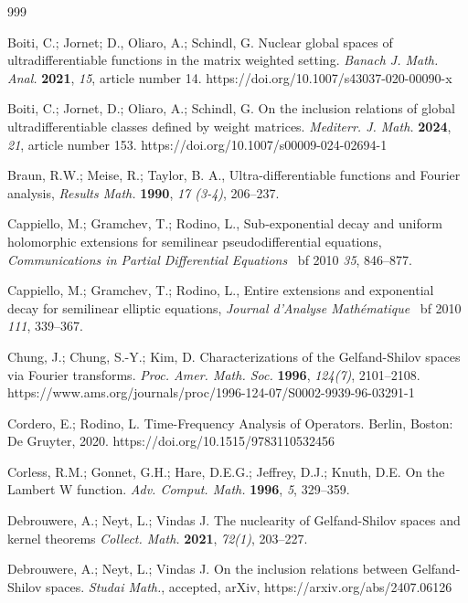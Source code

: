 \documentclass{article}
\theoremstyle{thmstyleone}
\theoremstyle{thmstyletwo}%
\theoremstyle{thmstylethree}%
\begin{document}
\begin{thebibliography}{999}

 Boiti, C.; Jornet; D., Oliaro, A.; Schindl, G.
Nuclear global spaces of ultradifferentiable functions in the matrix weighted setting.
{\em Banach J. Math. Anal. } {\bf 2021}, {\em 15}, article number 14.
https://doi.org/10.1007/s43037-020-00090-x


 Boiti, C.; Jornet, D.; Oliaro, A.; Schindl, G.
On the inclusion relations of global ultradifferentiable classes defined by weight matrices.
{\em Mediterr. J. Math.} {\bf 2024}, {\em 21}, article number 153.
https://doi.org/10.1007/s00009-024-02694-1

  Braun, R.W.; Meise, R.; Taylor, B. A., 
Ultra-differentiable functions and Fourier analysis, {\em Results Math.} {\bf 1990}, {\em 17 (3-4)}, 206--237.


 Cappiello, M.; Gramchev, T.; Rodino, L.,
Sub-exponential decay and uniform holomorphic extensions for
semilinear pseudodifferential equations, 
{\em Communications in  Partial
Differential Equations} {\ bf 2010} {\em 35}, 846--877. 

 Cappiello, M.; Gramchev, T.;  Rodino, L.,
Entire extensions and exponential decay for semilinear elliptic
equations, {\em Journal d'Analyse Math\'ematique } 
{\ bf 2010} {\em 111}, 339--367.


 Chung, J.; Chung, S.-Y.; Kim, D.
Characterizations of the Gelfand-Shilov spaces via Fourier transforms.
{\em Proc. Amer. Math. Soc.} {\bf 1996}, {\em 124(7)}, 2101--2108.
https://www.ams.org/journals/proc/1996-124-07/S0002-9939-96-03291-1

  Cordero, E.; Rodino, L. Time-Frequency Analysis of Operators. Berlin, Boston: De Gruyter, 2020. https://doi.org/10.1515/9783110532456


 Corless, R.M.; Gonnet, G.H.; Hare, D.E.G.; Jeffrey, D.J.; Knuth, D.E. 
On the Lambert W function.
{\em Adv. Comput. Math.} {\bf 1996}, {\em 5}, 329--359.

 Debrouwere, A.; Neyt, L.; Vindas J.
The nuclearity of Gelfand-Shilov spaces and kernel theorems
{\em Collect. Math.} {\bf 2021}, {\em  72(1)}, 203--227.

 Debrouwere, A.; Neyt, L.; Vindas J.
On the inclusion relations between Gelfand-Shilov spaces.
{\em Studai Math.}, accepted, 
arXiv, https://arxiv.org/abs/2407.06126



\end{thebibliography}
\end{document}
